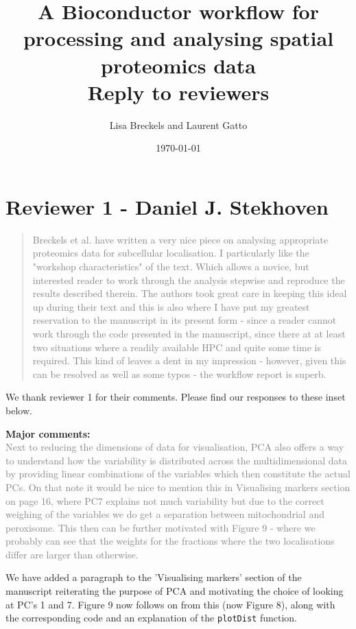 \documentclass[11pt]{article}
\author{Lisa Breckels and Laurent Gatto}
\date{\today}
\title{A Bioconductor workflow for processing and analysing spatial proteomics data \\ Reply to reviewers}
\begin{document}
\maketitle

\section*{Reviewer 1 - Daniel J. Stekhoven}

\begin{quote} \textcolor{gray} {Breckels et al. have written a very nice piece on analysing appropriate proteomics data for subcellular localisation. I particularly like the "workshop characteristics" of the text. Which allows a novice, but interested reader to work through the analysis stepwise and reproduce the results described therein. The authors took great care in keeping this ideal up during their text and this is also where I have put my greatest reservation to the manuscript in its present form - since a reader cannot work through the code presented in the manuscript, since there at at least two situations where a readily available HPC and quite some time is required. This kind of leaves a dent in my impression - however, given this can be resolved as well as some typos - the workflow report is superb.} \end{quote}

We thank reviewer 1 for their comments. Please find our responses to these inset below. \newline \newline

\textbf{Major comments:} \\

\textcolor{gray}{Next to reducing the dimensions of data for visualisation, PCA also offers a way to understand how the variability is distributed across the multidimensional data by providing linear combinations of the variables which then constitute the actual PCs. On that note it would be nice to mention this in Visualising markers section on page 16, where PC7 explains not much variability but due to the correct weighing of the variables we do get a separation between mitochondrial and peroxisome. This then can be further motivated with Figure 9 - where we probably can see that the weights for the fractions where the two localisations differ are larger than otherwise.} 

We have added a paragraph to the 'Visualising markers' section of the manuscript reiterating the purpose of PCA and motivating the choice of looking at PC's 1 and 7. Figure 9 now follows on from this (now Figure 8), along with the corresponding code and an explanation of the \texttt{plotDist} function. \\
\end{document}
